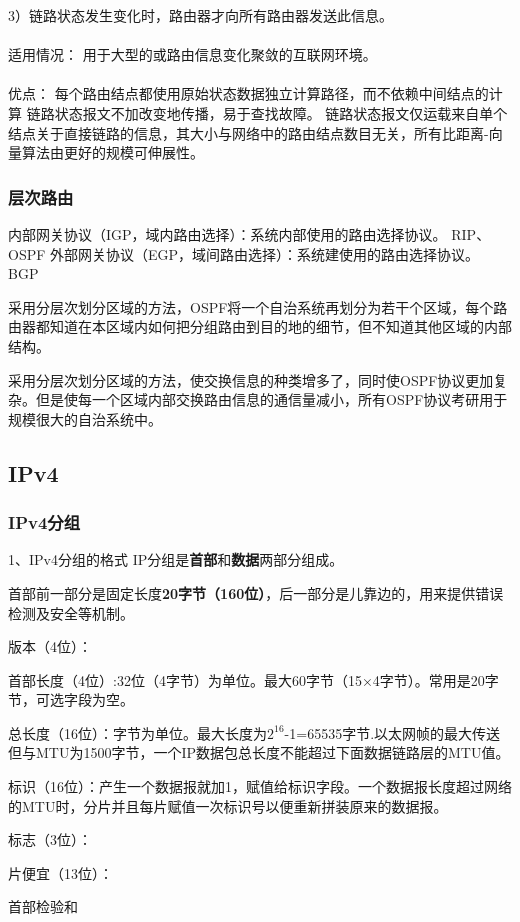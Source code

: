 \documentclass{ctexart}
\begin{document}
3）链路状态发生变化时，路由器才向所有路由器发送此信息。
\\\\
适用情况：
用于大型的或路由信息变化聚敛的互联网环境。
\\\\
优点：
每个路由结点都使用原始状态数据独立计算路径，而不依赖中间结点的计算
链路状态报文不加改变地传播，易于查找故障。
链路状态报文仅运载来自单个结点关于直接链路的信息，其大小与网络中的路由结点数目无关，所有比距离-向量算法由更好的规模可伸展性。

\subsubsection{层次路由}
内部网关协议（IGP，域内路由选择）：系统内部使用的路由选择协议。
RIP、OSPF
外部网关协议（EGP，域间路由选择）：系统建使用的路由选择协议。
BGP

采用分层次划分区域的方法，OSPF将一个自治系统再划分为若干个区域，每个路由器都知道在本区域内如何把分组路由到目的地的细节，但不知道其他区域的内部结构。

采用分层次划分区域的方法，使交换信息的种类增多了，同时使OSPF协议更加复杂。但是使每一个区域内部交换路由信息的通信量减小，所有OSPF协议考研用于规模很大的自治系统中。
\subsection{IPv4}
\subsubsection{IPv4分组}
1、IPv4分组的格式
IP分组是\textbf{首部}和\textbf{数据}两部分组成。

首部前一部分是固定长度\textbf{20字节（160位）}，后一部分是儿靠边的，用来提供错误检测及安全等机制。

版本（4位）：

首部长度（4位）:32位（4字节）为单位。最大60字节（15×4字节）。常用是20字节，可选字段为空。

总长度（16位）：字节为单位。最大长度为$2^{16}$-1=65535字节.以太网帧的最大传送但与MTU为1500字节，一个IP数据包总长度不能超过下面数据链路层的MTU值。

标识（16位）：产生一个数据报就加1，赋值给标识字段。一个数据报长度超过网络的MTU时，分片并且每片赋值一次标识号以便重新拼装原来的数据报。

标志（3位）：

片便宜（13位）：

首部检验和
\end{document}

